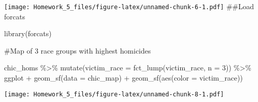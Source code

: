 \documentclass[
]{article}
\newenvironment{Shaded}{\begin{snugshade}}{\end{snugshade}}
\newcommand{\AttributeTok}[1]{\textcolor[rgb]{0.77,0.63,0.00}{#1}}
\newcommand{\DecValTok}[1]{\textcolor[rgb]{0.00,0.00,0.81}{#1}}
\newcommand{\FunctionTok}[1]{\textcolor[rgb]{0.00,0.00,0.00}{#1}}
\newcommand{\NormalTok}[1]{#1}
\newcommand{\SpecialCharTok}[1]{\textcolor[rgb]{0.00,0.00,0.00}{#1}}
\begin{document}
\texttt{[image: Homework\_5\_files/figure-latex/unnamed-chunk-6-1.pdf]}
\#\#Load forcats

\begin{Shaded}
\begin{Highlighting}[]
\FunctionTok{library}\NormalTok{(forcats)}
\end{Highlighting}
\end{Shaded}

\#Map of 3 race groups with highest homicides

\begin{Shaded}
\begin{Highlighting}[]
\NormalTok{chic\_homs }\SpecialCharTok{\%\textgreater{}\%}
  \FunctionTok{mutate}\NormalTok{(}\AttributeTok{victim\_race =} \FunctionTok{fct\_lump}\NormalTok{(victim\_race, }\AttributeTok{n =} \DecValTok{3}\NormalTok{)) }\SpecialCharTok{\%\textgreater{}\%}
\NormalTok{  ggplot }\SpecialCharTok{+}
  \FunctionTok{geom\_sf}\NormalTok{(}\AttributeTok{data =}\NormalTok{ chic\_map) }\SpecialCharTok{+}
  \FunctionTok{geom\_sf}\NormalTok{(}\FunctionTok{aes}\NormalTok{(}\AttributeTok{color =}\NormalTok{ victim\_race))}
\end{Highlighting}
\end{Shaded}

\texttt{[image: Homework\_5\_files/figure-latex/unnamed-chunk-8-1.pdf]}
\end{document}
